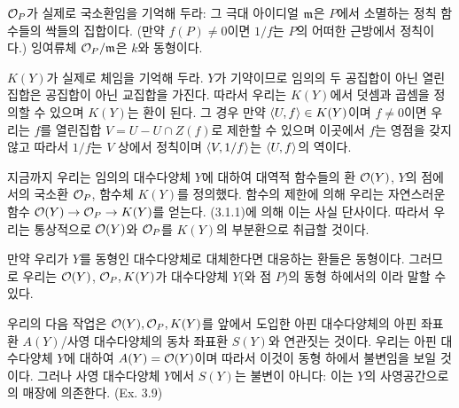 	$\mathcal{O}_P$가 실제로 국소환임을 기억해 두라: 그 극대 아이디얼 $\mathfrak{m}$은 $P$에서 소멸하는 정칙 함수들의 싹들의 집합이다.
	(만약 $f(P)\ne 0$이면 $1/f$는 $P$의 어떠한 근방에서 정칙이다.)
	잉여류체 $\mathcal{O}_P/\mathfrak{m}$은 $k$와 동형이다.
	
	
	\begin{definition}
	\end{definition}
	
	$K(Y)$가 실제로 체임을 기억해 두라. $Y$가 기약이므로 임의의 두 공집합이 아닌 열린집합은 공집합이 아닌 교집합을 가진다.
	따라서 우리는 $K(Y)$에서 덧셈과 곱셈을 정의할 수 있으며 $K(Y)$는 환이 된다.
	그 경우 만약 $\Braket{U,f}\in K(Y)$이며 $f\ne 0$이면 우리는 $f$를 열린집합 $V=U-U\cap Z(f)$로 제한할 수 있으며
	이곳에서 $f$는 영점을 갖지 않고 따라서 $1/f$는 $V$ 상에서 정칙이며 $\Braket{V,1/f}$는 $\Braket{U,f}$의 역이다.
	
	지금까지 우리는 임의의 대수다양체 $Y$에 대하여 대역적 함수들의 환 $\mathcal{O}(Y)$,
	$Y$의 점에서의 국소환 $\mathcal{O}_P$, 함수체 $K(Y)$를 정의했다.
	함수의 제한에 의해 우리는 자연스러운 함수 $\mathcal{O}(Y)\rightarrow\mathcal{O}_P\rightarrow K(Y)$를 얻는다.
	(3.1.1)에 의해 이는 사실 단사이다.
	따라서 우리는 통상적으로 $\mathcal{O}(Y)$와 $\mathcal{O}_P$를 $K(Y)$의 부분환으로 취급할 것이다.
	
	만약 우리가 $Y$를 동형인 대수다양체로 대체한다면 대응하는 환들은 동형이다.
	그러므로 우리는 $\mathcal{O}(Y)$, $\mathcal{O}_P,K(Y)$가 대수다양체 $Y$(와 점 $P$)의 동형 하에서의 이라 말할 수 있다.
	
	우리의 다음 작업은 $\mathcal{O}(Y),\mathcal{O}_P,K(Y)$를 앞에서 도입한
	아핀 대수다양체의 아핀 좌표환 $A(Y)$/사영 대수다양체의 동차 좌표환 $S(Y)$와 연관짓는 것이다.
	우리는 아핀 대수다양체 $Y$에 대하여 $A(Y)=\mathcal{O}(Y)$이며 따라서 이것이 동형 하에서 불변임을 보일 것이다.
	그러나 사영 대수다양체 $Y$에서 $S(Y)$는 불변이 아니다: 이는 $Y$의 사영공간으로의 매장에 의존한다. (Ex. 3.9)
	
